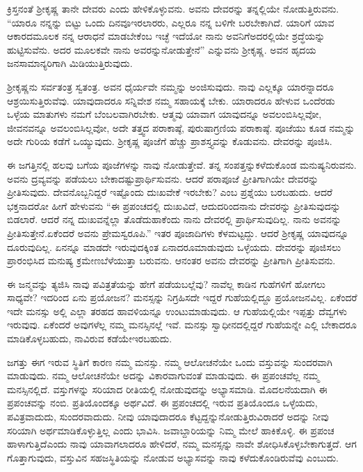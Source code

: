 ಕ್ರಿಸ್ತನಂತೆ ಶ‍್ರೀಕೃಷ್ಣ ತಾನೇ ದೇವರು ಎಂದು ಹೇಳಿಕೊಳ್ಳುವನು. ಅವನು ದೇವರನ್ನು ತನ್ನಲ್ಲಿಯೇ ನೋಡುತ್ತಿರುವನು. “ಯಾರೂ ನನ್ನನ್ನು ಬಿಟ್ಟು ಒಂದು ದಿನವೂ\break ಇರಲಾರರು, ಎಲ್ಲರೂ ನನ್ನ ಬಳಿಗೇ ಬರಬೇಕಾಗಿದೆ. ಯಾರಿಗೆ ಯಾವ ಆಕಾರದ\break ಮೂಲಕ ನನ್ನ ಆರಾಧನೆ ಮಾಡಬೇಕೆಂಬ ಇಚ್ಛೆ ಇದೆಯೋ ನಾನು ಅವನಿಗೆ\break ಅದರಲ್ಲಿಯೇ ಶ್ರದ್ಧೆಯನ್ನು ಹುಟ್ಟಿಸುವೆನು. ಅದರ ಮೂಲಕವೇ ನಾನು ಅವರನ್ನು\break ನೋಡುತ್ತೇನೆ” ಎನ್ನುವನು ಶ‍್ರೀಕೃಷ್ಣ. ಅವನ ಹೃದಯ ಜನಸಾಮಾನ್ಯರಿಗಾಗಿ ಮಿಡಿಯುತ್ತಿರುವುದು.

ಶ‍್ರೀಕೃಷ್ಣನು ಸರ್ವತಂತ್ರ ಸ್ವತಂತ್ರ. ಅವನ ಧೈರ್ಯವೇ ನಮ್ಮನ್ನು ಅಂಜಿಸುವುದು. ನಾವು ಎಲ್ಲಕ್ಕೂ ಯಾರನ್ನಾದರೂ ಆಶ್ರಯಿಸುತ್ತಿರುವೆವು. ಯಾವುದಾದರೂ ಸನ್ನಿವೇಶ ನಮ್ಮ ಸಹಾಯಕ್ಕೆ ಬೇಕು. ಯಾರಾದರೂ ಹೇಳುವ ಒಂದೆರಡು ಒಳ್ಳೆಯ ಮಾತುಗಳು ನಮಗೆ ಬೆಂಬಲವಾಗಿರಬೇಕು. ಆತ್ಮವು ಯಾವಾಗ ಯಾವುದನ್ನೂ ಅವಲಂಬಿಸಿಲ್ಲವೋ, ಜೀವನವನ್ನೂ ಅವಲಂಬಿಸಿಲ್ಲವೋ, ಅದೇ ತತ್ತ್ವದ ಪರಾಕಾಷ್ಠೆ, ಪುರುಷಾಗ್ರಣಿಯ ಪರಾಕಾಷ್ಠೆ. ಪೂಜೆಯು ಕೂಡ ನಮ್ಮನ್ನು ಅದೇ ಗುರಿಯ ಕಡೆಗೆ ಒಯ್ಯುವುದು. ಶ‍್ರೀಕೃಷ್ಣ ಪೂಜೆಗೆ ಹೆಚ್ಚು ಪ್ರಾಶಸ್ತ್ಯವನ್ನು ಕೊಡುವನು. ದೇವರನ್ನು ಪೂಜಿಸಿ.

ಈ ಜಗತ್ತಿನಲ್ಲಿ ಹಲವು ಬಗೆಯ ಪೂಜೆಗಳನ್ನು ನಾವು ನೋಡುತ್ತೇವೆ. ತನ್ನ ಸಂಪತ್ತನ್ನು\break ಕಳೆದುಕೊಂಡ ಮನುಷ್ಯನಿರುವನು. ಅವನು ದ್ರವ್ಯವನ್ನು ಪಡೆಯಲು ಬೇಕಾದಷ್ಟು\break ಪ್ರಾರ್ಥಿಸುವನು. ಆದರೆ ಪರಾಪೂಜೆ ಪ್ರೀತಿಗಾಗಿಯೇ ದೇವರನ್ನು ಪ್ರೀತಿಸುವುದು. ದೇವನೊಬ್ಬನಿದ್ದರೆ ಇಷ್ಟೊಂದು ದುಃಖವೇಕೆ ಇರಬೇಕು? ಎಂಬ ಪ್ರಶ್ನೆಯು ಬರಬಹುದು. ಆದರೆ ಭಕ್ತನಾದರೋ ಹೀಗೆ ಹೇಳುವನು “ಈ ಪ್ರಪಂಚದಲ್ಲಿ ದುಃಖವಿದೆ, ಆದುದರಿಂದ\break ನಾನು ದೇವರನ್ನು ಪ್ರೀತಿಸುವುದನ್ನು ಬಿಡಲಾರೆ. ಆದರೆ ನನ್ನ ದುಃಖವನ್ನೆಲ್ಲಾ ತೊಡೆದು\-ಹಾಕೆಂದು ನಾನು ದೇವರಲ್ಲಿ ಪ್ರಾರ್ಥಿಸುವುದಿಲ್ಲ. ನಾನು ಅವನನ್ನು ಪ್ರೀತಿಸುತ್ತೇನೆ.\break ಏಕೆಂದರೆ ಅವನು ಪ್ರೇಮಸ್ವರೂಪಿ.” ಇತರ ಪೂಜಾದಿಗಳು ಕೆಳಮಟ್ಟದ್ದು. ಆದರೆ ಶ‍್ರೀಕೃಷ್ಣ ಯಾವುದನ್ನೂ ದೂರುವುದಿಲ್ಲ. ಏನನ್ನೂ ಮಾಡದೇ ಇರುವುದಕ್ಕಿಂತ ಏನಾದರೂ\break ಮಾಡುವುದು ಒಳ್ಳೆಯದು. ದೇವರನ್ನು ಪೂಜಿಸಲು ಪ್ರಾರಂಭಿಸಿದ ಮನುಷ್ಯ ಕ್ರಮೇಣ\break ಬೆಳೆಯುತ್ತಾ ಬರುವನು. ಆನಂತರ ಅವನು ದೇವರನ್ನು ಪ್ರೀತಿಗಾಗಿ ಪ್ರೀತಿಸುವನು.

ಈ ಜನ್ಮವನ್ನು ತ್ಯಜಿಸಿ ನಾವು ಪವಿತ್ರತೆಯನ್ನು ಹೇಗೆ ಪಡೆಯಬಲ್ಲೆವು? ನಾವೆಲ್ಲ ಕಾಡಿನ ಗುಹೆಗಳಿಗೆ ಹೋಗಲು ಸಾಧ್ಯವೇ? ಇದರಿಂದ ಏನು ಪ್ರಯೋಜನ? ಮನಸ್ಸನ್ನು ನಿಗ್ರಹಿಸದೇ ಇದ್ದರೆ ಗುಹೆಯಲ್ಲಿದ್ದೂ ಪ್ರಯೋಜನವಿಲ್ಲ. ಏಕೆಂದರೆ ಇದೇ ಮನಸ್ಸು ಅಲ್ಲಿ ಎಲ್ಲಾ ತರಹದ ಹಾವಳಿಯನ್ನೂ ಉಂಟುಮಾಡುವುದು. ಆ ಗುಹೆಯಲ್ಲಿಯೇ ಇಪ್ಪತ್ತು ದೆವ್ವಗಳು ಇರುವುವು. ಏಕೆಂದರೆ ಅವುಗಳೆಲ್ಲ ನಮ್ಮ ಮನಸ್ಸಿನಲ್ಲೆ ಇವೆ. ಮನಸ್ಸು ಸ್ವಾಧೀನದಲ್ಲಿದ್ದರೆ ಗುಹೆಯನ್ನೇ ಎಲ್ಲಿ ಬೇಕಾದರೂ ಮಾಡಿಕೊಳ್ಳಬಹುದು, ನಾವಿರುವ ಕಡೆಯೇ\break ಇರಬಹುದು.

ಜಗತ್ತು ಈಗ ಇರುವ ಸ್ಥಿತಿಗೆ ಕಾರಣ ನಮ್ಮ ಮನಸ್ಸು. ನಮ್ಮ ಆಲೋಚನೆಯೇ ಒಂದು ವಸ್ತುವನ್ನು ಸುಂದರವಾಗಿ ಮಾಡುವುದು. ನಮ್ಮ ಆಲೋಚನೆಯೇ ಅದನ್ನು ವಿಕಾರವಾಗುವಂತೆ ಮಾಡುವುದು. ಈ ಪ್ರಪಂಚವೆಲ್ಲ ನಮ್ಮ ಮನಸ್ಸಿನಲ್ಲಿದೆ. ವಸ್ತುಗಳನ್ನು ಸರಿಯಾದ ರೀತಿಯಲ್ಲಿ ನೋಡುವುದನ್ನು ಅಭ್ಯಾಸಮಾಡಿ. ಮೊದಲನೆಯದಾಗಿ ಈ ಪ್ರಪಂಚವನ್ನು ನಂಬಿ. ಪ್ರತಿಯೊಂದಕ್ಕೂ ಅರ್ಥವಿದೆ. ಈ ಪ್ರಪಂಚದಲ್ಲಿ ಇರುವ ಪ್ರತಿಯೊಂದೂ ಒಳ್ಳೆಯದು, ಪವಿತ್ರವಾದುದು, ಸುಂದರವಾದುದು. ನೀವು ಯಾವುದಾದರೂ ಕೆಟ್ಟದ್ದನ್ನು\break ನೋಡುತ್ತಿರುವಿರಾದರೆ ಅದನ್ನು ನೀವು ಸರಿಯಾಗಿ ಅರ್ಥಮಾಡಿಕೊಳ್ಳುತ್ತಿಲ್ಲ ಎಂದು ಭಾವಿಸಿ. ಜವಾಬ್ದಾರಿಯನ್ನು ನಿಮ್ಮ ಮೇಲೆ ಹಾಕಿಕೊಳ್ಳಿ. ಈ ಪ್ರಪಂಚ ಹಾಳಾಗುತ್ತಿದೆ\break ಎಂದು ನಾವು ಯಾವಾಗಲಾದರೂ ಹೇಳಿದರೆ, ನಮ್ಮ ಮನಸ್ಸನ್ನು ನಾವೇ ಶೋಧಿಸಿಕೊಳ್ಳಬೇಕಾಗುತ್ತದೆ. ಆಗ ಗೊತ್ತಾಗುವುದು, ವಸ್ತುವಿನ ಸಹಜಸ್ಥಿತಿಯನ್ನು ನೋಡುವ ಅಭ್ಯಾಸವನ್ನು ನಾವು ಕಳೆದುಕೊಂಡಿರುವೆವು ಎಂಬುದು.

